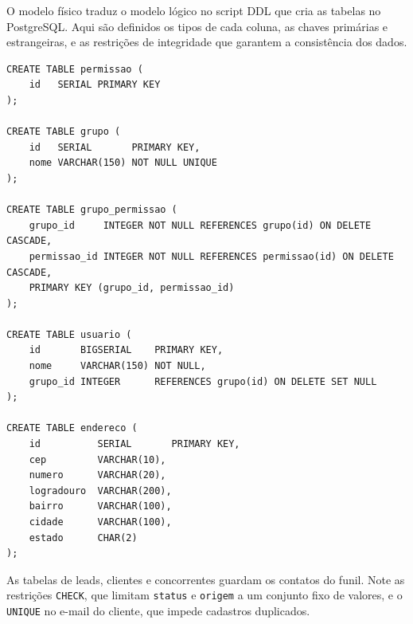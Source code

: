 \documentclass[a4paper]{article}
\begin{document}
O modelo físico traduz o modelo lógico no script DDL que cria as tabelas no PostgreSQL.
Aqui são definidos os tipos de cada coluna, as chaves primárias e estrangeiras, e as
restrições de integridade que garantem a consistência dos dados.

\begin{verbatim}
CREATE TABLE permissao (
    id   SERIAL PRIMARY KEY
);

CREATE TABLE grupo (
    id   SERIAL       PRIMARY KEY,
    nome VARCHAR(150) NOT NULL UNIQUE
);

CREATE TABLE grupo_permissao (
    grupo_id     INTEGER NOT NULL REFERENCES grupo(id) ON DELETE CASCADE,
    permissao_id INTEGER NOT NULL REFERENCES permissao(id) ON DELETE CASCADE,
    PRIMARY KEY (grupo_id, permissao_id)
);

CREATE TABLE usuario (
    id       BIGSERIAL    PRIMARY KEY,
    nome     VARCHAR(150) NOT NULL,
    grupo_id INTEGER      REFERENCES grupo(id) ON DELETE SET NULL
);

CREATE TABLE endereco (
    id          SERIAL       PRIMARY KEY,
    cep         VARCHAR(10),
    numero      VARCHAR(20),
    logradouro  VARCHAR(200),
    bairro      VARCHAR(100),
    cidade      VARCHAR(100),
    estado      CHAR(2)
);
\end{verbatim}

As tabelas de leads, clientes e concorrentes guardam os contatos do funil. Note as
restrições \texttt{CHECK}, que limitam \texttt{status} e \texttt{origem} a um conjunto fixo
de valores, e o \texttt{UNIQUE} no e-mail do cliente, que impede cadastros duplicados.
\end{document}
